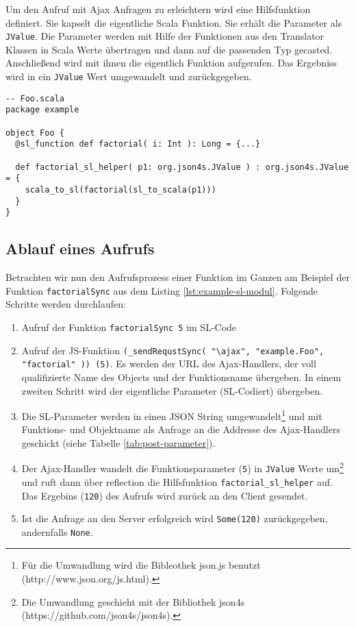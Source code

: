 \documentclass[12pt]{scrreprt}
\begin{document}
Um den Aufruf mit Ajax Anfragen zu erleichtern wird eine Hilfsfunktion definiert. Sie kapselt die eigentliche Scala Funktion. Sie erhält die Parameter als \lstinline!JValue!. Die Parameter werden mit Hilfe der Funktionen aus den Translator Klassen in Scala Werte übertragen und dann auf die passenden Typ gecasted. Anschließend wird mit ihnen die eigentlich Funktion aufgerufen. Das Ergebniss wird in ein \lstinline!JValue! Wert umgewandelt und zurückgegeben.

\begin{lstlisting}[caption=Hilfsfunktion zur Funktion aus Listing \ref{lst:example-function}, label=lst:helperfunction, float=h]
-- Foo.scala
package example

object Foo {
  @sl_function def factorial( i: Int ): Long = {...}
  
  def factorial_sl_helper( p1: org.json4s.JValue ) : org.json4s.JValue = {
    scala_to_sl(factorial(sl_to_scala(p1)))
  }
}
\end{lstlisting}


\subsection{Ablauf eines Aufrufs}
\label{subs:call-scala-functions}

Betrachten wir nun den Aufrufsprozess einer Funktion im Ganzen am Beispiel der Funktion \lstinline!factorialSync! aus dem Listing \ref{lst:example-sl-modul}. Folgende Schritte werden durchlaufen:
\begin{enumerate}
 \item{Aufruf der Funktion \lstinline!factorialSync 5! im \ac{SL}-Code}
 \item{Aufruf der \ac{JS}-Funktion \lstinline!(_sendRequstSync( "\ajax", "example.Foo", "factorial" )) (5)!. Es werden der \ac{URL} des Ajax-Handlers, der voll qualifizierte Name des Objects und der Funktionsname übergeben. In einem zweiten Schritt wird der eigentliche Parameter (\ac{SL}-Codiert) übergeben.}
 \item{Die \ac{SL}-Parameter werden in einen JSON String umgewandelt\footnote{Für die Umwandlung wird die Bibleothek json.js benutzt (http://www.json.org/js.html).} und mit Funktions- und Objektname als Anfrage an die Addresse des Ajax-Handlers geschickt (siehe Tabelle \ref{tab:post-parameter}).}
 \item{Der Ajax-Handler wandelt die Funktionsparameter (\lstinline!5!) in \lstinline!JValue! Werte um\footnote{Die Umwandlung geschieht mit der Bibliothek json4s (https://github.com/json4s/json4s).} und ruft dann über reflection die Hilfsfunktion \lstinline!factorial_sl_helper! auf. Das Ergebins (\lstinline!120!) des Aufrufs wird zurück an den Client gesendet.}
 \item{Ist die Anfrage an den Server erfolgreich wird \lstinline!Some(120)! zurückgegeben, andernfalls \lstinline!None!.}
\end{enumerate}
\end{document}
